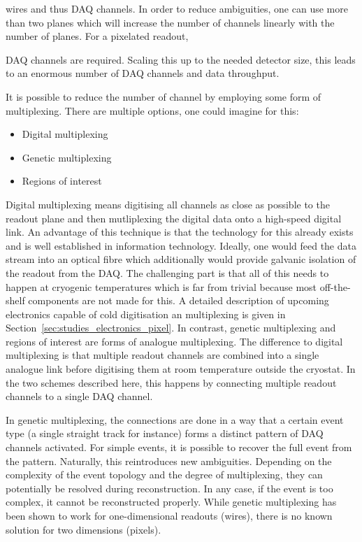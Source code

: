 wires and thus DAQ channels.
In order to reduce ambiguities, one can use more than two planes which will increase the number of channels linearly with the number of planes.
For a pixelated readout,


DAQ channels are required.
Scaling this up to the needed detector size, this leads to an enormous number of DAQ channels and data throughput.

It is possible to reduce the number of channel by employing some form of multiplexing.
There are multiple options, one could imagine for this:
\begin{itemize}
	\item Digital multiplexing
	\item Genetic multiplexing
	\item Regions of interest
\end{itemize}

Digital multiplexing means digitising all channels as close as possible to the readout plane and then mutliplexing the digital data onto a high-speed digital link.
An advantage of this technique is that the technology for this already exists and is well established in information technology.
Ideally, one would feed the data stream into an optical fibre which additionally would provide galvanic isolation of the readout from the DAQ.
The challenging part is that all of this needs to happen at cryogenic temperatures which is far from trivial because most off-the-shelf components are not made for this.
A detailed description of upcoming electronics capable of cold digitisation an multiplexing is given in Section~\ref{sec:studies_electronics_pixel}.
In contrast, genetic multiplexing and regions of interest are forms of analogue multiplexing.
The difference to digital multiplexing is that multiple readout channels are combined into a single analogue link before digitising them at room temperature outside the cryostat.
In the two schemes described here, this happens by connecting multiple readout channels to a single DAQ channel.

In genetic multiplexing, the connections are done in a way that a certain event type (a single straight track for instance) forms a distinct pattern of DAQ channels activated.
For simple events, it is possible to recover the full event from the pattern.
Naturally, this reintroduces new ambiguities.
Depending on the complexity of the event topology and the degree of multiplexing, they can potentially be resolved during reconstruction.
In any case, if the event is too complex, it cannot be reconstructed properly.
While genetic multiplexing has been shown to work for one-dimensional readouts (wires), there is no known solution for two dimensions (pixels).

